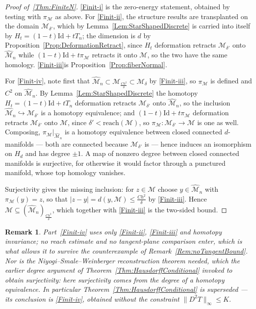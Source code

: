 \documentclass[11pt]{amsart}%
\theoremstyle{plain}
\newtheorem{remark}[definition]{Remark}
\newcommand{\1}{\mathbf{1}}
\newcommand{\M}{\mathcal{M}}
\begin{document}
\begin{proof}[Proof of~\ref{Thm:FiniteN}]
    \ref{Finit-i} is the zero-energy statement, obtained by testing with $\pi_\M$ as above. For \ref{Finit-ii}, the
    structure results are transplanted on the domain $\M_{\delta'}$, which by
    Lemma~\ref{Lem:StarShapedDiscrete} is carried into itself by $H_t=(1-t)\mathrm{Id}+tT_n$; the
    dimension is $d$ by Proposition~\ref{Prop:DeformationRetract}, since $H_t$ deformation retracts
    $\M_{\delta'}$ onto $\widehat{\M}_n$ while $(1-t)\mathrm{Id}+t\pi_\M$ retracts it onto $\M$, so
    the two have the same homology. \ref{Finit-iii}is Proposition~\ref{Prop:fiberNormal}.

    For \ref{Finit-iv}, note first that $\widehat{\M}_n\subset \M_{\frac{Ch^2}{\delta}}\subset \M_\delta$ by \ref{Finit-iii},
    so $\pi_\M$ is defined and $C^2$ on $\widehat{\M}_n$. By Lemma~\ref{Lem:StarShapedDiscrete}
    the homotopy $H_t=(1-t)\mathrm{Id}+tT_n$ deformation retracts $\M_{\delta'}$ onto
    $\widehat{\M}_n$, so the inclusion $\widehat{\M}_n\hookrightarrow \M_{\delta'}$ is a
    homotopy equivalence; and $(1-t)\mathrm{Id}+t\pi_\M$ deformation retracts $\M_{\delta'}$ onto
    $\M$, since $\delta'<\mathrm{reach}(\M)$, so $\pi_\M:\M_{\delta'}\to \M$ is one as well. Composing,
    $\pi_\M|_{\widehat{\M}_n}$ is a homotopy equivalence between closed connected $d$-manifolds
    --- both are connected because $\M_{\delta'}$ is --- hence induces an isomorphism on $H_d$ and
    has degree $\pm1$. A map of nonzero degree between closed connected manifolds is surjective, for
    otherwise it would factor through a punctured manifold, whose top homology vanishes.

    Surjectivity gives the missing inclusion: for $z\in \M$ choose $y\in\widehat{\M}_n$ with
    $\pi_\M(y)=z$, so that $|z-y|=d(y,\M)\le \frac{Ch^2}{\delta}$ by \ref{Finit-iii}. Hence
    $\M\subseteq(\widehat{\M}_n)_{\frac{Ch^2}{\delta}}$, which together with \ref{Finit-iii} is the two-sided bound.

\end{proof}

\begin{remark}
    Part~\ref{Finit-iv} uses only \ref{Finit-ii}, \ref{Finit-iii} and homotopy invariance; no reach estimate and no tangent-plane
    comparison enter, which is what allows it to survive the counterexample of
    Remark~\ref{Rem:noTangentBound}. Nor is the Niyogi--Smale--Weinberger reconstruction theorem
    needed, which the earlier degree argument of Theorem~\ref{Thm:HausdorffConditional} invoked to
    obtain surjectivity: here surjectivity comes from the degree of a homotopy equivalence. In
    particular Theorem~\ref{Thm:HausdorffConditional} is superseded --- its conclusion is \ref{Finit-iv},
    obtained without the constraint $\|D^2T\|_\infty\le K$.
\end{remark}
\end{document}
